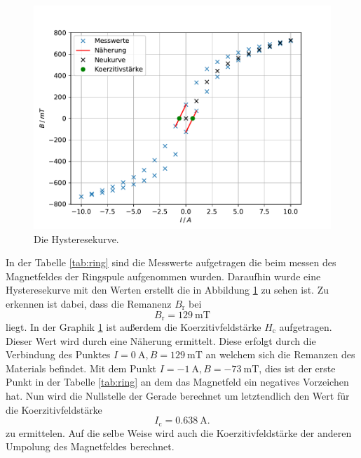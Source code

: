 \begin{figure}
\centering
\includegraphics[width=\textwidth]{content/data/plot_ring.pdf}
\caption{Die Hysteresekurve.}
\label{fig:ring}
\end{figure}

In der Tabelle \ref{tab:ring} sind die Messwerte aufgetragen die beim messen des Magnetfeldes der Ringspule aufgenommen wurden.
Daraufhin wurde eine Hysteresekurve mit den Werten erstellt die in Abbildung \ref{fig:ring} zu sehen ist.
Zu erkennen ist dabei, dass die Remanenz $B_\text{r}$ bei 
\begin{equation*}
  B_\text{r} =\SI{129}{\milli\tesla}
\end{equation*}
liegt.
In der Graphik \ref{fig:ring} ist außerdem die Koerzitivfeldstärke $H_\text{c}$ aufgetragen.
Dieser Wert wird durch eine Näherung ermittelt.
Diese erfolgt durch die Verbindung des Punktes $I=\SI{0}{\ampere}, B=\SI{129}{\milli\tesla}$ an welchem sich die Remanzen des Materials befindet.
Mit dem Punkt $I=\SI{-1}{\ampere},B=\SI{-73}{\milli\tesla}$, dies ist der erste Punkt in der Tabelle \ref{tab:ring} an dem das Magnetfeld ein negatives Vorzeichen hat.
Nun wird die Nullstelle der Gerade berechnet um letztendlich den Wert für die Koerzitivfeldstärke
\begin{equation*}
  I_\text{c} =\SI{0.638}{\ampere}.
\end{equation*}
zu ermittelen.
Auf die selbe Weise wird auch die Koerzitivfeldstärke der anderen Umpolung des Magnetfeldes berechnet.

